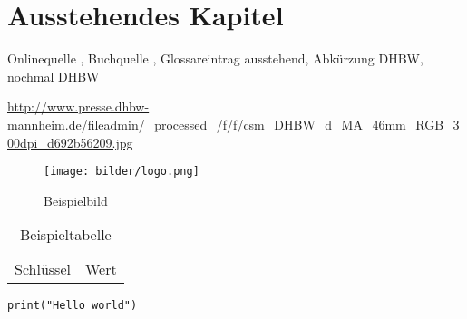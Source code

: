 \section{Ausstehendes Kapitel}

Onlinequelle \cite{OnlineKey}, Buchquelle \cite[S.~1]{BookKey}, Glossareintrag \gls{ausstehend}, Abkürzung \ac{DHBW}, nochmal \ac{DHBW}

\begin{sloppypar}
\url{http://www.presse.dhbw-mannheim.de/fileadmin/_processed_/f/f/csm_DHBW_d_MA_46mm_RGB_300dpi_d692b56209.jpg} %
\end{sloppypar}

\begin{figure}
    \caption{Beispielbild}
    \texttt{[image: bilder/logo.png]}
\end{figure}

\begin{table}
    \caption{Beispieltabelle}
    \begin{tabular}{ll}
        Schlüssel&Wert
    \end{tabular}
\end{table}

\begin{lstlisting}
print("Hello world")
\end{lstlisting}

